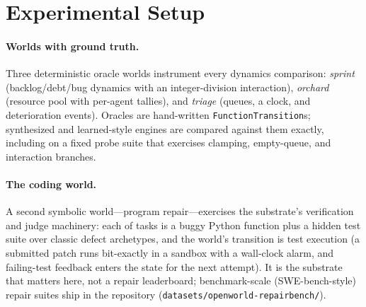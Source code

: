\documentclass[11pt]{article}
\begin{document}
\begin{table}[htb]\centering\small

\caption{\textbf{Prototyping-latency benchmark (E68/E68b).} \ProtoNumWorlds{} world models
across \ProtoNumSectors{} sectors, each authored by Claude Code (\texttt{openworld
build}) and timed; all saved as recipes. Two gates of increasing strictness:
\emph{Validated} counts worlds passing the structural \texttt{validate\_spec} gate
(well-formed, round-tripping, servable; \ProtoValidationRate); \emph{Executable} counts
those that also evolve state under a random rollout in the behavioral audit
(\ProtoExecutableRate; the one exception is a recipe whose random-action rollout leaves
state unchanged). Wall-clock varies run-to-run (LLM latency), so this reproduces in
distribution (minutes-scale). Per-world characteristics: Figure~\ref{fig:world-atlas}.}
\label{tab:prototyping}
\end{table}

\section{Experimental Setup}
\paragraph{Worlds with ground truth.} Three deterministic oracle worlds
instrument every dynamics comparison: \emph{sprint} (backlog/debt/bug
dynamics with an integer-division interaction), \emph{orchard} (resource pool
with per-agent tallies), and \emph{triage} (queues, a clock, and
deterioration events). Oracles are hand-written
\texttt{FunctionTransition}s; synthesized and learned-style engines are
compared against them exactly, including on a fixed probe suite that
exercises clamping, empty-queue, and interaction branches.

\paragraph{The coding world.} A second symbolic world---program repair---exercises the
substrate's verification and judge machinery: each of \NumTasks{} tasks is a buggy Python
function plus a hidden test suite over classic defect archetypes, and the world's transition
is test execution (a submitted patch runs bit-exactly in a sandbox with a wall-clock
alarm, and failing-test feedback enters the state for the next attempt). It is the substrate
that matters here, not a repair leaderboard; benchmark-scale (SWE-bench-style) repair suites
ship in the repository (\texttt{datasets/openworld-repairbench/}).
\end{document}
